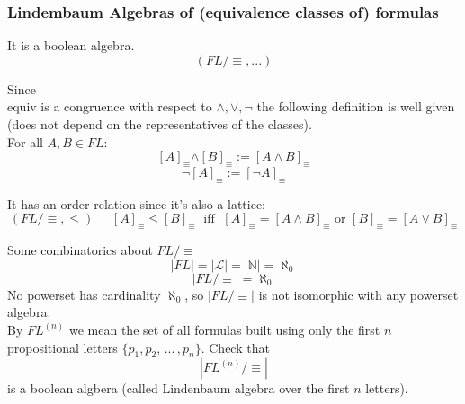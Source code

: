 \documentclass[11pt]{article}
\begin{document}
	\newpage
	
	\subsubsection{Lindembaum Algebras of (equivalence classes of) formulas}
	It is a boolean algebra.\\
	
	$$ (FL/\equiv, ...)$$
	
	Since \\equiv is a congruence with respect to $\wedge, \vee, \neg$ the following definition is well given (does not depend on the representatives of the classes).\\
	
	For all $A, B \in FL$:
	$$ [A]_\equiv \bm{\wedge} [B]_\equiv := [A \wedge B]_\equiv$$
	$$ \neg [A]_\equiv := [\neg A]_\equiv $$
	
	It has an order relation since it's also a lattice: 
	$$ (FL/\equiv, \leq) \;\;\;\;\; [A]_\equiv \leq [B]_\equiv  \; \text{ iff } \; [A]_\equiv = [A \wedge B]_\equiv \text{ or } [B]_\equiv = [A \vee B]_\equiv $$
	
	Some combinatorics about $FL/\equiv$
	$$ |FL| = |\mathcal{L}| = |\mathbb{N}| = \aleph_0 $$
	$$ |FL/\equiv| = \aleph_0 $$
	No powerset has cardinality $\aleph_0$, so $|FL / \equiv|$ is not isomorphic with any powerset algebra.\\
	
	By $FL^{(n)}$ we mean the set of all formulas built using only the first $n$ propositional letters $\{p_1, p_2, \, ... \, , p_n\}$. Check that  %
	$$ |FL^{(n)}/\equiv|$$
	is a boolean algbera (called Lindenbaum algebra over the first $n$ letters).\\
	
\end{document}
